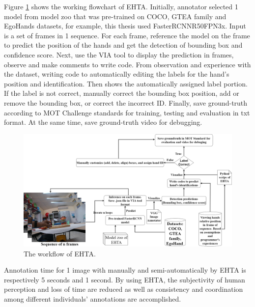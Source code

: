 Figure \ref{fig:EHTA} shows the working flowchart of EHTA. Initially, annotator selected 1 model from model zoo that was pre-trained on COCO, GTEA family and EgoHands datasets, for example, this thesis used FasterRCNNR50FPN3x. Input is a set of frames in 1 sequence. For each frame, reference the model on the frame to predict the position of the hands and get the detection of bounding box and confidence score. Next, use the VIA tool to display the prediction in frames, observe and make comments to write code. From observation and experience with the dataset, writing code to automatically editing the labels for the hand’s position and identification. Then shows the automatically assigned label portion. If the label is not correct, manually correct the bounding box position, add or remove the bounding box, or correct the incorrect ID. Finally, save ground-truth according to MOT Challenge standards for training, testing and evaluation in txt format. At the same time, save ground-truth video for debugging.
\begin{figure}
	\centerline{\includegraphics[width=1\linewidth]{Figs/EHTAflowchartPage2.png}}
	\caption{The workflow of EHTA.}
	\label{fig:EHTA}
\end{figure}
Annotation time for 1 image with manually and semi-automatically by EHTA is respectively 5 seconds and 1 second. By using EHTA, the subjectivity of human perception and loss of time are reduced as well as consistency and coordination among different individuals' annotations are accomplished.